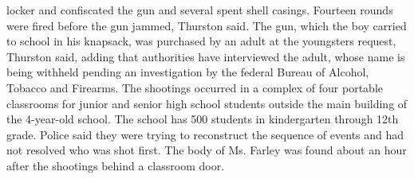 \documentclass{article}
\begin{document}
locker and confiscated the gun and several spent shell casings. Fourteen rounds were fired before the gun jammed, Thurston said. The gun, which the boy carried to school in his knapsack, was purchased by an adult at the youngsters request, Thurston said, adding that authorities have interviewed the adult, whose name is being withheld pending an investigation by the federal Bureau of Alcohol, Tobacco and Firearms. The shootings occurred in a complex of four portable classrooms for junior and senior high \color[rgb]{0.6431372549019608,0.2784313725490196,0.35294117647058826}school students \color[rgb]{0.9921568627450981,0.6549019607843137,0.5882352941176471}outside the main building of the 4-year-old \color[rgb]{0.6431372549019608,0.2784313725490196,0.35294117647058826}school. The school has 500 students in \color[rgb]{0.9921568627450981,0.6549019607843137,0.5882352941176471}kindergarten through 12th grade. Police said they were trying to reconstruct the sequence of events and had not resolved who was shot first. The body of Ms. Farley was found about an hour after the shootings behind a classroom door. 
\end{document}
